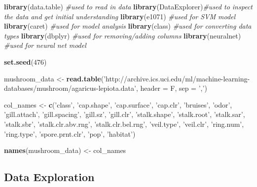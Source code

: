 \documentclass[
  english,
  man]{apa6}
\newenvironment{Shaded}{\begin{snugshade}}{\end{snugshade}}
\newcommand{\CommentTok}[1]{\textcolor[rgb]{0.56,0.35,0.01}{\textit{#1}}}
\newcommand{\DataTypeTok}[1]{\textcolor[rgb]{0.13,0.29,0.53}{#1}}
\newcommand{\DecValTok}[1]{\textcolor[rgb]{0.00,0.00,0.81}{#1}}
\newcommand{\KeywordTok}[1]{\textcolor[rgb]{0.13,0.29,0.53}{\textbf{#1}}}
\newcommand{\NormalTok}[1]{#1}
\newcommand{\StringTok}[1]{\textcolor[rgb]{0.31,0.60,0.02}{#1}}
\begin{document}
\begin{Shaded}
\begin{Highlighting}[]
\KeywordTok{library}\NormalTok{(data.table) }\CommentTok{#used to read in data}
\KeywordTok{library}\NormalTok{(DataExplorer)}\CommentTok{#used to inspect the data and get initial understanding}
\KeywordTok{library}\NormalTok{(e1071) }\CommentTok{#used for SVM model}
\KeywordTok{library}\NormalTok{(caret) }\CommentTok{#used for model analysis}
\KeywordTok{library}\NormalTok{(class) }\CommentTok{#used for converting data types}
\KeywordTok{library}\NormalTok{(dbplyr) }\CommentTok{#used for removing/adding columns}
\KeywordTok{library}\NormalTok{(neuralnet) }\CommentTok{#used for neural net model}

\KeywordTok{set.seed}\NormalTok{(}\DecValTok{476}\NormalTok{)}

\NormalTok{mushroom_data <-}\StringTok{ }\KeywordTok{read.table}\NormalTok{(}\StringTok{'http://archive.ics.uci.edu/ml/machine-learning-databases/mushroom/agaricus-lepiota.data'}\NormalTok{, }\DataTypeTok{header =}\NormalTok{ F, }\DataTypeTok{sep =} \StringTok{','}\NormalTok{)}

\NormalTok{col_names <-}\StringTok{ }\KeywordTok{c}\NormalTok{(}\StringTok{'class'}\NormalTok{, }\StringTok{'cap.shape'}\NormalTok{, }\StringTok{'cap.surface'}\NormalTok{, }\StringTok{'cap.clr'}\NormalTok{, }\StringTok{'bruises'}\NormalTok{, }\StringTok{'odor'}\NormalTok{,}
               \StringTok{'gill.attach'}\NormalTok{, }\StringTok{'gill.spacing'}\NormalTok{, }\StringTok{'gill.sz'}\NormalTok{, }\StringTok{'gill.clr'}\NormalTok{,}
               \StringTok{'stalk.shape'}\NormalTok{, }\StringTok{'stalk.root'}\NormalTok{, }\StringTok{'stalk.sar'}\NormalTok{, }\StringTok{'stalk.sbr'}\NormalTok{,}
               \StringTok{'stalk.clr.abv.rng'}\NormalTok{, }\StringTok{'stalk.clr.bel.rng'}\NormalTok{, }\StringTok{'veil.type'}\NormalTok{, }\StringTok{'veil.clr'}\NormalTok{,}
               \StringTok{'ring.num'}\NormalTok{, }\StringTok{'ring.type'}\NormalTok{, }\StringTok{'spore.prnt.clr'}\NormalTok{, }\StringTok{'pop'}\NormalTok{, }\StringTok{'habitat'}\NormalTok{)}

\KeywordTok{names}\NormalTok{(mushroom_data) <-}\StringTok{ }\NormalTok{col_names}
\end{Highlighting}
\end{Shaded}

\hypertarget{data-exploration}{%
\subsection{Data Exploration}\label{data-exploration}}
\end{document}
